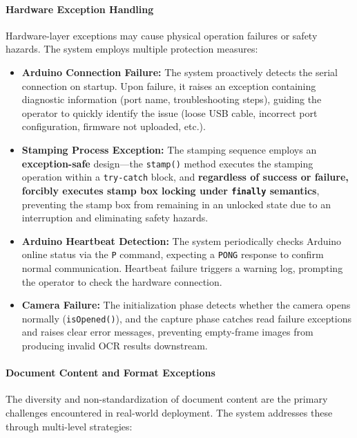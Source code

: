 \documentclass[conference]{IEEEtran}
\begin{document}
\paragraph{Hardware Exception Handling}

Hardware-layer exceptions may cause physical operation failures or safety hazards. The system employs multiple protection measures:

\begin{itemize}[leftmargin=*]
    \item \textbf{Arduino Connection Failure:} The system proactively detects the serial connection on startup. Upon failure, it raises an exception containing diagnostic information (port name, troubleshooting steps), guiding the operator to quickly identify the issue (loose USB cable, incorrect port configuration, firmware not uploaded, etc.).
    \item \textbf{Stamping Process Exception:} The stamping sequence employs an \textbf{exception-safe} design---the \texttt{stamp()} method executes the stamping operation within a \texttt{try-catch} block, and \textbf{regardless of success or failure, forcibly executes stamp box locking under \texttt{finally} semantics}, preventing the stamp box from remaining in an unlocked state due to an interruption and eliminating safety hazards.
    \item \textbf{Arduino Heartbeat Detection:} The system periodically checks Arduino online status via the \texttt{P} command, expecting a \texttt{PONG} response to confirm normal communication. Heartbeat failure triggers a warning log, prompting the operator to check the hardware connection.
    \item \textbf{Camera Failure:} The initialization phase detects whether the camera opens normally (\texttt{isOpened()}), and the capture phase catches read failure exceptions and raises clear error messages, preventing empty-frame images from producing invalid OCR results downstream.
\end{itemize}

\paragraph{Document Content and Format Exceptions}

The diversity and non-standardization of document content are the primary challenges encountered in real-world deployment. The system addresses these through multi-level strategies:
\end{document}
